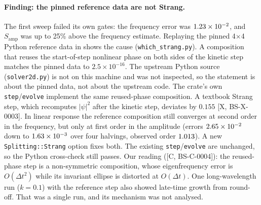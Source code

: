 \documentclass[11pt]{article}
\theoremstyle{remark}
\newcommand{\tier}[1]{\textsf{[#1]}}
\begin{document}
\paragraph{Finding: the pinned reference data are not Strang.} The first sweep failed its own gates: the frequency error
was $1.23\times10^{-2}$, and $S_\mathrm{amp}$ was up to 25\% above the frequency estimate. Replaying the pinned 4$\times$4 Python
reference data in  shows the cause (\texttt{which\_strang.py}). A composition that
reuses the start-of-step nonlinear phase on both sides of the kinetic step matches the pinned data to
$2.5\times10^{-16}$. The upstream Python source (\texttt{solver2d.py}) is not on this machine and was not inspected,
so the statement is about the pinned data, not about the upstream code. The crate's own \texttt{step}/\texttt{evolve}
implement the same reused-phase composition. A textbook Strang step, which recomputes $|\psi|^2$ after the kinetic step, deviates by $0.155$
\tier{X, BS-X-0003}. In linear response the reference composition still converges at second order in the frequency,
but only at first order in the amplitude (errors $2.65\times10^{-2}$ down to $1.63\times10^{-3}$ over four halvings, observed
order $1.013$). A new \texttt{Splitting::Strang} option fixes both. The existing \texttt{step}/\texttt{evolve}
are unchanged, so the Python cross-check still passes. Our reading (\tier{C, BS-C-0004}): the reused-phase step is a
non-symmetric composition, whose eigenfrequency error is $O(\Delta t^2)$ while its invariant ellipse is distorted at
$O(\Delta t)$. One long-wavelength run ($k=0.1$) with the reference step also showed late-time growth from round-off.
That was a single run, and its mechanism was not analysed.
\end{document}
